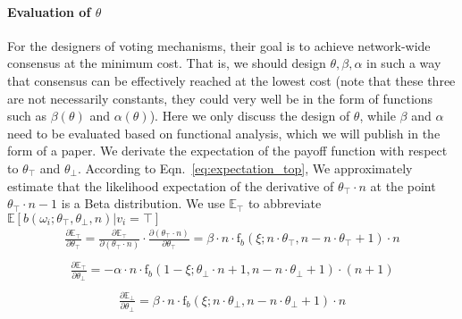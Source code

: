 \documentclass[11pt]{article}
\begin{document}
  \paragraph{Evaluation of $\theta$}
  For the designers of voting mechanisms, their goal is to achieve network-wide consensus at the minimum cost. That is, we should design $\theta, \beta, \alpha$ in such a way that consensus can be effectively reached at the lowest cost (note that these three are not necessarily constants, they could very well be in the form of functions such as $\beta(\theta)$ and $\alpha(\theta)$). Here we only discuss the design of $\theta$, while $\beta$ and $\alpha$ need to be evaluated based on functional analysis, which we will publish in the form of a paper. We derivate the expectation of the payoff function with respect to $\theta_\top$ and $\theta_\bot$. According to Eqn.~\ref{eq:expectation_top}, We approximately estimate that the likelihood expectation of the derivative of $\theta_\top\cdot n$ at the point $\theta_\top\cdot n -1$ is a Beta distribution. We use $\mathbb{E}_\top$ to abbreviate $\mathbb{E}[b(\omega_i;\theta_\top,\theta_\bot,n)|v_i=\top]$
  \begin{equation}
    \label{eq:expectation_top_to_top}
    \begin{aligned}
    \frac{\partial{\mathbb{E}}_\top}{\partial{\theta_\top}}=\frac{\partial\mathbb{E}_\top}{\partial(\theta_\top\cdot n)}\cdot\frac{\partial(\theta_\top\cdot n)}{\partial\theta_\top}= \beta\cdot n \cdot \text{f}_b(\xi;n\cdot\theta_\top,n-n\cdot\theta_\top+1)\cdot{n}\\
    \end{aligned}
  \end{equation}
  \begin{equation}
    \label{eq:expectation_top_to_bot}
    \begin{aligned}
    \frac{\partial{\mathbb{E}}_\top}{\partial{\theta_\bot}}= -\alpha\cdot n \cdot  \text{f}_b(1-\xi;\theta_\bot\cdot n+1,n-n\cdot\theta_\bot+1)\cdot(n+1)\\
    \end{aligned}
  \end{equation}
  \begin{equation}
    \label{eq:expectation_bot_to_bot}
    \begin{aligned}
    \frac{\partial{\mathbb{E}}_\bot}{\partial{\theta_\bot}}= \beta\cdot n \cdot \text{f}_b(\xi;n\cdot\theta_\bot,n-n\cdot\theta_\bot+1)\cdot{n}\\
    \end{aligned}
  \end{equation}
\end{document}
